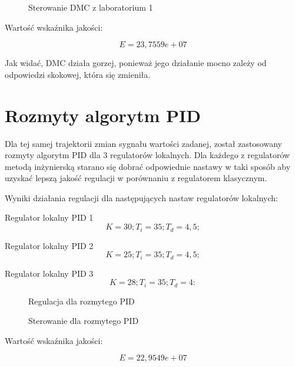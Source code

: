 \begin{figure}[H]
\centering

\caption{Sterowanie DMC z laboratorium 1}
\end{figure}

Wartość wskaźnika jakości:

\begin{equation}
E = 23,7559e+07
\end{equation}

Jak widać, DMC działa gorzej, ponieważ jego działanie mocno zależy od odpowiedzi skokowej, która się zmieniła.

\section{Rozmyty algorytm PID}

Dla tej samej trajektorii zmian sygnału wartości zadanej, został zastosowany rozmyty algorytm PID dla 3 regulatorów lokalnych. Dla każdego z regulatorów metodą inżynierską starano się 
dobrać odpowiednie nastawy w taki sposób aby uzyskać lepszą jakość regulacji w porównaniu z regulatorem klasycznym.

Wyniki działania regulacji dla następujących nastaw regulatorów lokalnych:

Regulator lokalny PID 1
\begin{equation}
K = 30; 
T_i = 35; 
T_d = 4,5; 
\end{equation}

Regulator lokalny PID 2
\begin{equation}
K = 25; 
T_i = 35; 
T_d = 4,5; 
\end{equation}

Regulator lokalny PID 3
\begin{equation}
K = 28; 
T_i = 35; 
T_d = 4: 
\end{equation}

\begin{figure}[H]
\centering

\caption{Regulacja dla rozmytego PID}
\end{figure}

\begin{figure}[H]
\centering

\caption{Sterowanie dla rozmytego PID}
\end{figure}

Wartość wskaźnika jakości:

\begin{equation}
E = 22,9549e+07
\end{equation}

